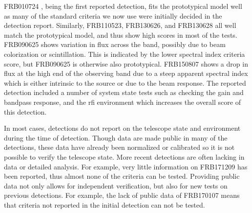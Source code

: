 \documentclass[a4paper,fleqn,usenatbib]{mnras}
\begin{document}
FRB010724 \citep{2007Sci...318..777L}, being the first reported detection, fits
the prototypical model well as many of the standard criteria we now use were
initially decided in the detection report.  Similarly, FRB110523, FRB130626, and
FRB130628 all well match the prototypical model, and thus show high scores in
most of the tests. FRB090625 shows variation in flux across the band, possibly
due to beam colorization or scintillation.  This is indicated by the lower
spectral index criteria score, but FRB090625 is otherwise also prototypical.
FRB150807 shows a drop in flux at the high end of the observing band due to a
steep apparent spectral index which is either intrinsic to the source or due to
the beam response. The reported detection included a number of system state
tests such as checking the gain and bandpass response, and the \gls{rfi}
environment which increases the overall score of this detection.

In most cases, detections do not report on the telescope state and environment
during the time of detection. Though data are made public in many of the
detections, these data have already been normalized or calibrated so it is not
possible to verify the telescope state. More recent detections are often lacking
in data or detailed analysis. For example, very little information on
FRB171209 has been reported, thus almost none of the criteria can be tested.
Providing public data not only allows for independent verification, but also for
new tests on previous detections. For example, the lack of public data of
FRB170107 means that criteria not reported in the initial detection can not be
tested.
\end{document}
